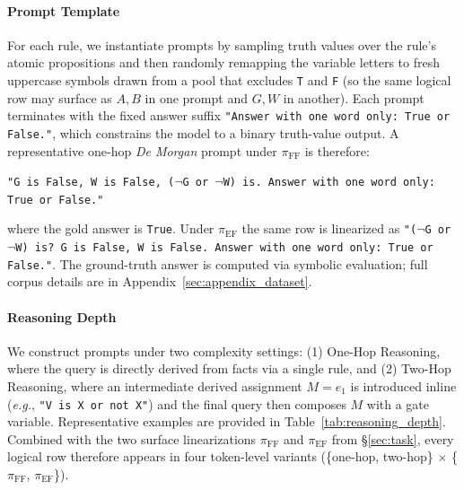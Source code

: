 \documentclass[11pt]{article}
\begin{document}



\paragraph{Prompt Template}
For each rule, we instantiate prompts by sampling truth values over the rule's atomic propositions and then randomly remapping the variable letters to fresh uppercase symbols drawn from a pool that excludes \texttt{T} and \texttt{F} (so the same logical row may surface as $A,B$ in one prompt and $G,W$ in another). Each prompt terminates with the fixed answer suffix \texttt{"Answer with one word only: True or False."}, which constrains the model to a binary truth-value output. A representative one-hop \textit{De Morgan} prompt under $\pi_{\mathrm{FF}}$ is therefore:
\begin{center}
\texttt{"G is False, W is False, ($\neg$G or $\neg$W) is. Answer with one word only: True or False."}
\end{center}
where the gold answer is \texttt{True}. Under $\pi_{\mathrm{EF}}$ the same row is linearized as \texttt{"($\neg$G or $\neg$W) is? G is False, W is False. Answer with one word only: True or False."}. The ground-truth answer is computed via symbolic evaluation; full corpus details are in Appendix~\ref{sec:appendix_dataset}.

\paragraph{Reasoning Depth}
We construct prompts under two complexity settings: (1) One-Hop Reasoning, where the query is directly derived from facts via a single rule, and (2) Two-Hop Reasoning, where an intermediate derived assignment $M = e_{1}$ is introduced inline (\textit{e.g.}, \texttt{"V is X or not X"}) and the final query then composes $M$ with a gate variable. Representative examples are provided in Table~\ref{tab:reasoning_depth}. Combined with the two surface linearizations $\pi_{\mathrm{FF}}$ and $\pi_{\mathrm{EF}}$ from \S\ref{sec:task}, every logical row therefore appears in four token-level variants (\{one-hop, two-hop\} $\times$ \{$\pi_{\mathrm{FF}}$, $\pi_{\mathrm{EF}}$\}).
\end{document}
